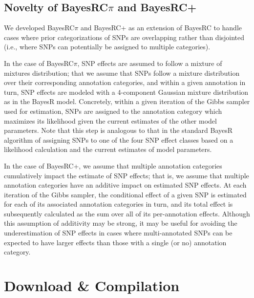 \documentclass{ol-softwaremanual}
\begin{document}
\subsection{Novelty of BayesRC$\pi$ and BayesRC+}

We developed BayesRC$\pi$ and BayesRC+ as an extension of BayesRC to handle cases where prior categorizations of SNPs are overlapping rather than disjointed (i.e., where SNPs can potentially be assigned to multiple categories). 

In the case of BayesRC$\pi$, SNP effects are assumed to follow a mixture of mixtures distribution; that we assume that SNPs follow a mixture distribution over their corresponding annotation categories, and within a given annotation in turn, SNP effects are modeled with a 4-component Gaussian mixture distribution as in the BayesR model. Concretely, within a given iteration of the Gibbs sampler used for estimation, SNPs are assigned to the annotation category which maximizes its likelihood given the current estimates of the other model parameters. Note that this step is analogous to that in the standard BayesR algorithm of assigning SNPs to one of the four SNP effect classes based on a likelihood calculation and the current estimates of model parameters. 

In the case of BayesRC+, we assume that multiple annotation categories cumulatively impact the estimate of SNP effects; that is, we assume that multiple annotation categories have an additive impact on estimated SNP effects. At each iteration of the Gibbs sampler, the conditional effect of a given SNP is estimated for each of its associated annotation categories in turn, and its total effect is subsequently calculated as the sum over all of its per-annotation effects. Although this assumption of additivity may be strong, it may be useful for avoiding the underestimation of SNP effects in cases where multi-annotated SNPs can be expected to have larger effects than those with a single (or no) annotation category.



\section{Download \& Compilation}
\end{document}
